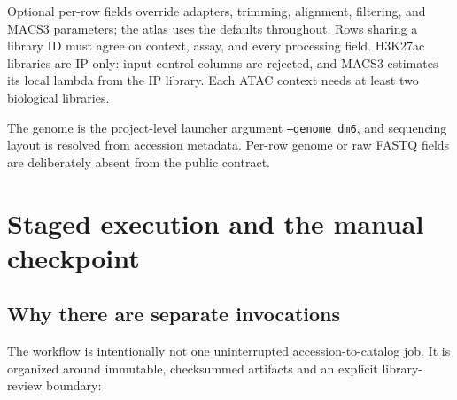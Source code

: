 \documentclass[11pt]{article}
\begin{document}
Optional per-row fields override adapters, trimming, alignment, filtering, and
MACS3 parameters; the atlas uses the defaults throughout.  Rows sharing a
library ID must agree on context, assay, and every processing field.  H3K27ac
libraries are IP-only: input-control columns are rejected, and MACS3 estimates
its local lambda from the IP library.  Each ATAC context needs at least two
biological libraries.

The genome is the project-level launcher argument \texttt{--genome dm6}, and
sequencing layout is resolved from accession metadata.  Per-row genome or raw
FASTQ fields are deliberately absent from the public contract.

\section{Staged execution and the manual checkpoint}

\subsection{Why there are separate invocations}

The workflow is intentionally not one uninterrupted accession-to-catalog job.
It is organized around immutable, checksummed artifacts and an explicit
library-review boundary:

\begin{center}
\end{center}
\end{document}

